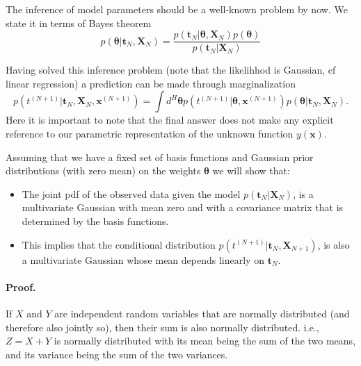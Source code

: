 \documentclass[%
oneside,                 %
final,                   %
10pt]{article}
\newenvironment{notice_mdfboxadmon}[1][]{
\begin{notice_mdfboxmdframed}[frametitle=#1]
}
{
\end{notice_mdfboxmdframed}
}
\begin{document}
The inference of model parameters should be a well-known problem by now. We state it in terms of Bayes theorem
\[
p \left( \boldsymbol{\theta} | \boldsymbol{t}_N, \boldsymbol{X}_N \right)
= \frac{ p \left( \boldsymbol{t}_N | \boldsymbol{\theta}, \boldsymbol{X}_N \right) p \left( \boldsymbol{\theta} \right)}{p \left( \boldsymbol{t}_N | \boldsymbol{X}_N \right)}
\]

Having solved this inference problem (note that the likelihhod is Gaussian, cf linear regression) a prediction can be made through marginalization
\[
p\left( t^{(N+1)} | \boldsymbol{t}_N, \boldsymbol{X}_{N}, \boldsymbol{x}^{(N+1)} \right) 
= \int d^H \boldsymbol{\theta} 
p\left( t^{(N+1)} | \boldsymbol{\theta}, \boldsymbol{x}^{(N+1)} \right)
p \left( \boldsymbol{\theta} | \boldsymbol{t}_N, \boldsymbol{X}_N \right).
\]
Here it is important to note that the final answer does not make any explicit reference to our parametric representation of the unknown function $y(\boldsymbol{x})$.

Assuming that we have a fixed set of basis functions and Gaussian prior distributions (with zero mean) on the weights $\boldsymbol{\theta}$ we will show that:

\begin{itemize}
\item The joint pdf of the observed data given the model $p( \boldsymbol{t}_N |  \boldsymbol{X}_N)$, is a multivariate Gaussian with mean zero and with a covariance matrix that is determined by the basis functions.

\item This implies that the conditional distribution $p( t^{(N+1)} | \boldsymbol{t}_N, \boldsymbol{X}_{N+1})$, is also a multivariate Gaussian whose mean depends linearly on $\boldsymbol{t}_N$.
\end{itemize}

\noindent
\paragraph{Proof.}

\begin{notice_mdfboxadmon}
If $X$ and $Y$ are independent random variables that are normally distributed (and therefore also jointly so), then their sum is also normally distributed. i.e., $Z=X+Y$ is normally distributed with its mean being the sum of the two means, and its variance being the sum of the two variances.
\end{notice_mdfboxadmon} %
\end{document}
